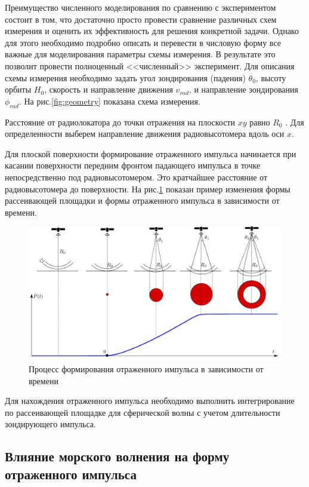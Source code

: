 Преимущество численного моделирования по сравнению с экспериментом состоит в
том, что достаточно просто провести сравнение различных схем измерения и
оценить их эффективность для решения конкретной задачи. Однако для этого
необходимо подробно описать и перевести в числовую форму все важные для
моделирования параметры схемы измерения. В результате это позволит провести
полноценный <<численный>> эксперимент.  Для описания схемы измерения необходимо
задать угол зондирования (падения) $\theta_0$, высоту орбиты $H_0$, скорость и
направление движения $v_{rad}$, и направление зондирования $\phi_{rad}$. На рис.\ref{fig:geometry} показана схема измерения. 

Расстояние от радиолокатора до точки отражения на плоскости $xy$ равно $R_0$ .
Для определенности выберем направление движения радиовысотомера вдоль оси $x$.


Для плоской поверхности формирование отраженного импульса начинается при
касании поверхности передним фронтом падающего импульса в точке непосредственно
под радиовысотомером. Это кратчайшее расстояние от радиовысотомера до
поверхности. На рис.\ref{fig:wave_form} показан пример изменения формы
рассеивающей площадки и формы отраженного импульса в зависимости от времени.
\begin{figure}[h]
    \centering
    \includegraphics[]{fig/flat_wave1.pdf}
    \caption{Процесс формирования отраженного импульса в зависимости от времени}
    \label{fig:wave_form}
\end{figure}

Для нахождения отраженного импульса необходимо выполнить интегрирование по
рассеивающей площадке для сферической волны с учетом длительности зондирующего
импульса.


\subsection{Влияние морского волнения на форму отраженного импульса}%
\label{sub:vliianie_morskogo_volneniia_na_vormu_otrazhennogo_impul_sa}

